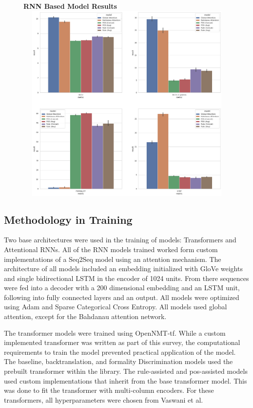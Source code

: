 \documentclass[12pt]{article}
\begin{document}
\begin{figure}[ht]
    \centering
    \textbf{RNN Based Model Results}
    \includegraphics[width=12cm, height=10cm]{RNN-plots.png}
\end{figure}

\subsection{Methodology in Training}
Two base architectures were used in the training of models: Transformers and Attentional RNNs. 
All of the RNN models trained worked form custom implementations of a Seq2Seq model using 
an attention mechanism. The architecture of all models included an embedding initialized with GloVe weights 
and single bidirectional LSTM in the encoder of 1024 units. From there sequences were fed into 
a decoder with a 200 dimensional embedding and an LSTM unit, following into fully connected layers
and an output. All models were optimized using Adam and Sparse Categorical Cross Entropy. All models
used global attention, except for the Bahdanau attention network. \par

The transformer models were trained using OpenNMT-tf. While a custom implemented transformer
was written as part of this survey, the computational requirements to train the model prevented 
practical application of the model. The baseline, backtranslation, and formality Discrimination
models used the prebuilt transformer within the library. The rule-assisted and pos-assisted models
used custom implementations that inherit from the base transformer model. This was done to fit 
the transformer with multi-column encoders. For these transformers, all hyperparameters were 
chosen from Vaswani et al.~\cite{AAYN}
\end{document}
